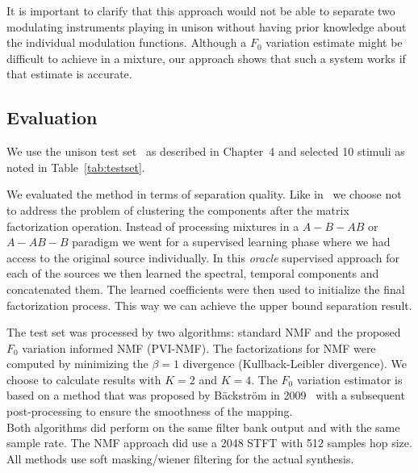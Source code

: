 It is important to clarify that this approach would not be able to separate two modulating instruments playing in unison without having prior knowledge about the individual modulation functions. Although a $F_0$ variation estimate might be difficult to achieve in a mixture, our approach shows that such a system works if that estimate is accurate.

\subsection{Evaluation}
We use the unison test set~\cite{oss_unison} as described in Chapter~4 and selected 10 stimuli as noted in Table~\ref{tab:testset}.

We evaluated the method in terms of separation quality.
Like in~\cite{barker13} we choose not to address the problem of clustering the components after the matrix factorization operation.
Instead of processing mixtures in a $A-B-AB$ or $A-AB-B$ paradigm we went for a supervised learning phase where we had access to the original source individually.
In this \emph{oracle} supervised approach for each of the sources we then learned the spectral, temporal components and concatenated them. The learned coefficients were then used to initialize the final factorization process. This way we can achieve the upper bound separation result.

The test set was processed by two algorithms: standard \acs{NMF} and the proposed $F_0$ variation informed \acs{NMF} (PVI-NMF). The factorizations for \acs{NMF} were computed by minimizing the $\beta = 1$ divergence (Kullback-Leibler divergence).
We choose to calculate results with $K=2$ and $K=4$.
The $F_0$ variation estimator is based on a method that was proposed by B\"ackstr\"om in 2009~\cite{backstrom09} with a subsequent post-processing to ensure the smoothness of the mapping.\\

Both algorithms did perform on the same filter bank output and with the same sample rate. The \acs{NMF} approach did use a 2048 \acs{STFT} with 512 samples hop size.
All methods use soft masking/wiener filtering for the actual synthesis.

